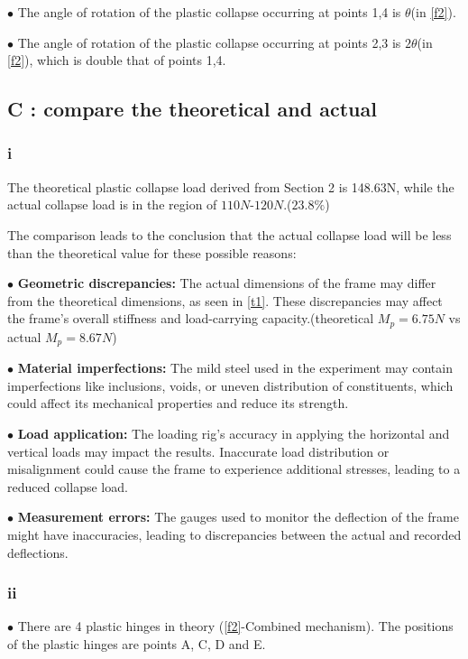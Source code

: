 $\bullet$ The angle of rotation of the plastic collapse occurring at points 1,4 is $\theta$(in \autoref{f2}).

$\bullet$ The angle of rotation of the plastic collapse occurring at points 2,3 is $2\theta$(in \autoref{f2}), which is double that of points 1,4.

\subsection*{C : compare the theoretical and actual}
\subsubsection*{i}

The theoretical plastic collapse load derived from Section 2 is 148.63N, while the actual collapse load is in the region of $110N$-$120N$.($23.8\%$)

The comparison leads to the conclusion that the actual collapse load will be less than the theoretical value for these possible reasons:

$\bullet$ \textbf{Geometric discrepancies:} The actual dimensions of the frame may differ from the theoretical dimensions, as seen in \autoref{t1}. These discrepancies may affect the frame's overall stiffness and load-carrying capacity.(theoretical $M_p=6.75N$ vs actual $M_p=8.67N$)

$\bullet$ \textbf{Material imperfections:} The mild steel used in the experiment may contain imperfections like inclusions, voids, or uneven distribution of constituents, which could affect its mechanical properties and reduce its strength.

$\bullet$ \textbf{Load application:} The loading rig's accuracy in applying the horizontal and vertical loads may impact the results. Inaccurate load distribution or misalignment could cause the frame to experience additional stresses, leading to a reduced collapse load.

$\bullet$ \textbf{Measurement errors:} The gauges used to monitor the deflection of the frame might have inaccuracies, leading to discrepancies between the actual and recorded deflections.

\subsubsection*{ii}

$\bullet$ There are 4 plastic hinges in theory (\autoref{f2}-Combined mechanism). The positions of the plastic hinges are points A, C, D and E.

